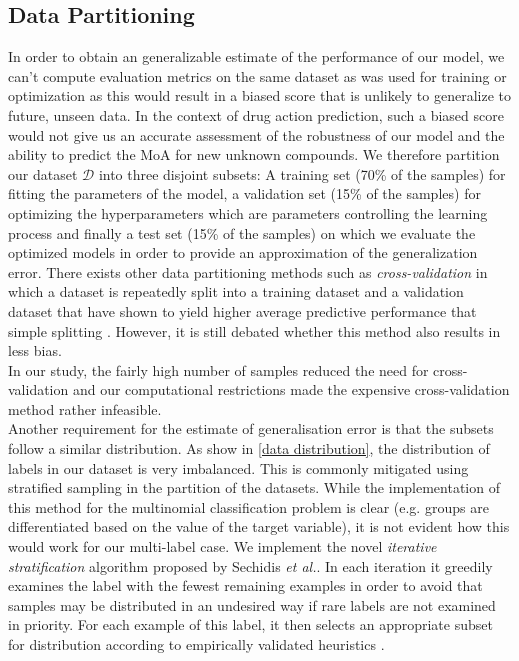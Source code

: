 \documentclass[bsc,frontabs,twoside,singlespacing,parskip,deptreport]{infthesis}     %
\begin{document}
\subsection{Data Partitioning}
In order to obtain an generalizable estimate of the performance of our model, we can't compute evaluation metrics on the same dataset as was used for training or optimization as this would result in a biased score that is unlikely to generalize to future, unseen data. In the context of drug action prediction, such a biased score would not give us an accurate assessment of the robustness of our model and the ability to predict the MoA for new unknown compounds. 
We therefore partition our dataset \(\mathscr{D}\) into three disjoint subsets: A training set (70\% of the samples) for fitting the parameters of the model, a validation set (15\% of the samples) for optimizing the hyperparameters which are parameters controlling the learning process and finally a test set (15\% of the samples) on which we evaluate the optimized models in order to provide an approximation of the generalization error.
There exists other data partitioning methods such as \textit{cross-validation} in which a dataset is repeatedly split into a training dataset and a validation dataset that have shown to yield higher average predictive performance that simple splitting \cite{schaffer_selecting_1993}. However, it is still debated whether this method also results in less bias. \\
In our study, the fairly high number of samples reduced the need for cross-validation and our computational restrictions made the expensive cross-validation method rather infeasible. \\
Another requirement for the estimate of generalisation error is that the subsets follow a similar distribution. As show in \ref{data distribution}, the distribution of labels in our dataset is very imbalanced. This is commonly mitigated using stratified sampling in the partition of the datasets. While the implementation of this method for the multinomial classification problem is clear (e.g. groups are differentiated based on the value of the target variable), it is not evident how this would work for our multi-label case. We implement the novel \textit{iterative stratification} algorithm proposed by Sechidis \textit{et al.}. In each iteration it greedily examines the label with the fewest remaining examples in order to avoid that samples may be distributed in an undesired way if rare labels are not examined in priority. For each example of this label, it then selects an appropriate subset for distribution according to empirically validated heuristics \cite{sechidis_stratication_nodate}.
\end{document}
